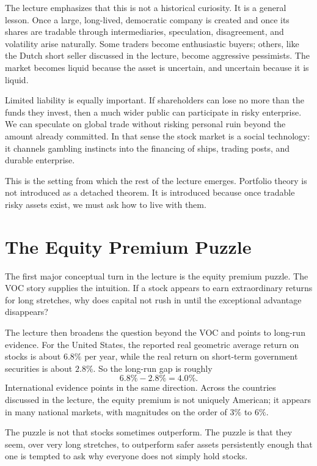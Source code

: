 The lecture emphasizes that this is not a historical curiosity. It is a general lesson. Once a large, long-lived, democratic company is created and once its shares are tradable through intermediaries, speculation, disagreement, and volatility arise naturally. Some traders become enthusiastic buyers; others, like the Dutch short seller discussed in the lecture, become aggressive pessimists. The market becomes liquid because the asset is uncertain, and uncertain because it is liquid.

Limited liability is equally important. If shareholders can lose no more than the funds they invest, then a much wider public can participate in risky enterprise. We can speculate on global trade without risking personal ruin beyond the amount already committed. In that sense the stock market is a social technology: it channels gambling instincts into the financing of ships, trading posts, and durable enterprise.

This is the setting from which the rest of the lecture emerges. Portfolio theory is not introduced as a detached theorem. It is introduced because once tradable risky assets exist, we must ask how to live with them.

\section{The Equity Premium Puzzle}

The first major conceptual turn in the lecture is the equity premium puzzle. The VOC story supplies the intuition. If a stock appears to earn extraordinary returns for long stretches, why does capital not rush in until the exceptional advantage disappears?

The lecture then broadens the question beyond the VOC and points to long-run evidence. For the United States, the reported real geometric average return on stocks is about \(6.8\%\) per year, while the real return on short-term government securities is about \(2.8\%\). So the long-run gap is roughly
\begin{equation}
6.8\% - 2.8\% = 4.0\%.
\end{equation}
International evidence points in the same direction. Across the countries discussed in the lecture, the equity premium is not uniquely American; it appears in many national markets, with magnitudes on the order of \(3\%\) to \(6\%\).

The puzzle is not that stocks sometimes outperform. The puzzle is that they seem, over very long stretches, to outperform safer assets persistently enough that one is tempted to ask why everyone does not simply hold stocks.

